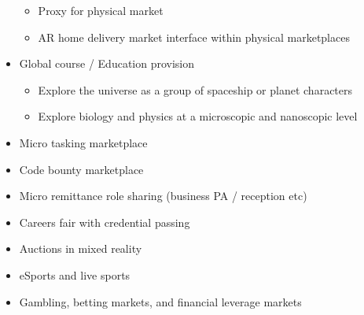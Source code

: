 \documentclass[
	12pt, %
	fleqn, %
	a4paper, %
	oneside, %
]{LegrandOrangeBook}
\begin{document}
\begin{itemize}
  \begin{itemize}
  \item
    Proxy for physical market
  \item
    AR home delivery market interface within physical marketplaces
  \end{itemize}
\item
  Global course / Education provision
    \begin{itemize}
  \item
    Explore the universe as a group of spaceship or planet characters
  \item
    Explore biology and physics at a microscopic and nanoscopic level
  \end{itemize}
\item
  Micro tasking marketplace
\item
  Code bounty marketplace
\item
  Micro remittance role sharing (business PA / reception etc)
\item
  Careers fair with credential passing
\item
  Auctions in mixed reality
\item
  eSports and live sports
\item
  Gambling, betting markets, and financial leverage markets
\end{itemize}
\end{document}
